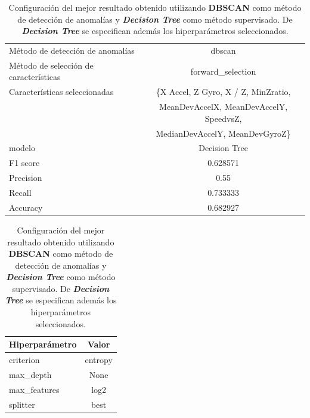 \begin{appendices}
		\begin{table}[htb]
			\centering
			\caption{Configuración del mejor resultado obtenido utilizando \textbf{DBSCAN} como método de detección de anomalías y \textbf{\emph{Decision Tree}}
			como método supervisado. De \textbf{\emph{Decision Tree}} se especifican además los hiperparámetros seleccionados.}
			\label{table:23}
			\begin{tabular}{lc}
				\toprule
					  Método de detección de anomalías &                                             dbscan \\
				Método de selección de características &                                  forward\_selection \\
						 Características seleccionadas &		\{X Accel, Z Gyro, X / Z, MinZratio, \\
						 							   &			MeanDevAccelX, MeanDevAccelY, SpeedvsZ, \\
													   &                                   MedianDevAccelY, MeanDevGyroZ\} \\
												modelo &                                      Decision Tree \\
											  F1 score &                                           0.628571 \\
											 Precision &                                               0.55 \\
												Recall &                                           0.733333 \\
											  Accuracy &                                           0.682927 \\
				\bottomrule
			\end{tabular}
			\newline
			\newline

			\begin{tabular}{lc}
				\toprule
				Hiperparámetro &   Valor \\
				\midrule
					 criterion & entropy \\
					 max\_depth &    None \\
				  max\_features &    log2 \\
					  splitter &    best \\
				\bottomrule
			\end{tabular}
			
		\end{table}


\end{appendices}
